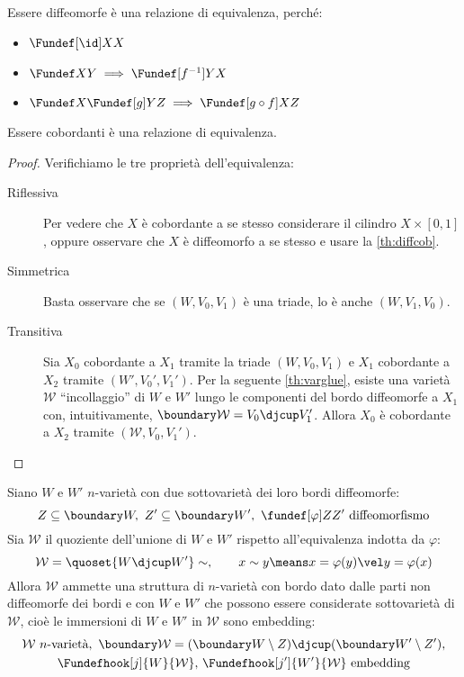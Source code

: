 \begin{oss}
	Essere diffeomorfe è una relazione di equivalenza, perché:
	\begin{itemize}
		\item $\Fundef[\id]XX$
		\item $\Fundef XY\implies\Fundef[f^{-1}]YX$
		\item $\Fundef X{\Fundef[g]YZ}\implies\Fundef[g\circ f]XZ$
	\end{itemize}
\end{oss}

\begin{lemma}
	Essere cobordanti è una relazione di equivalenza.
\end{lemma}

\begin{proof}
	Verifichiamo le tre proprietà dell'equivalenza:
	\begin{description}
		\item[Riflessiva]
			Per vedere che $X$ è cobordante a se stesso considerare il cilindro $X\times[0,1]$, oppure osservare che $X$ è diffeomorfo a se stesso e usare la \autoref{th:diffcob}.
		\item[Simmetrica]
			Basta osservare che se $(W,V_0,V_1)$ è una triade, lo è anche $(W,V_1,V_0)$.
		\item[Transitiva]
			Sia $X_0$ cobordante a $X_1$ tramite la triade $(W,V_0,V_1)$ e $X_1$ cobordante a $X_2$ tramite $(W',V_0',V_1')$.
			Per la seguente \autoref{th:varglue}, esiste una varietà $\mathcal W$ ``incollaggio'' di $W$ e $W'$ lungo le componenti del bordo diffeomorfe a $X_1$ con, intuitivamente, $\boundary\mathcal W=V_0\djcup V_1'$.
			Allora $X_0$ è cobordante a $X_2$ tramite $(\mathcal W,V_0,V_1')$.
			\qedhere
	\end{description}
\end{proof}

\begin{center}
	\vspace{-7mm} %
	
\end{center}

\begin{prop}[Incollaggio]
	\label{th:varglue}
	Siano $W$ e $W'$ $n$-varietà con due sottovarietà dei loro bordi diffeomorfe:
	\[Z\subseteq\boundary W,\ Z'\subseteq\boundary W',\ \fundef[\varphi]Z{Z'}\text{ diffeomorfismo}\]
	Sia $\mathcal W$ il quoziente dell'unione di $W$ e $W'$ rispetto all'equivalenza indotta da $\varphi$:
	\[\mathcal W=\quoset{W\djcup W'}\sim,\qquad x\sim y\means x=\varphi(y)\vel y=\varphi(x)\]
	Allora $\mathcal W$ ammette una struttura di $n$-varietà con bordo dato dalle parti non diffeomorfe dei bordi e con $W$ e $W'$ che possono essere considerate sottovarietà di $\mathcal W$, cioè le immersioni di $W$ e $W'$ in $\mathcal W$ sono embedding:
	\begin{gather*}
		\mathcal W\text{ $n$-varietà},\ \boundary\mathcal W=(\boundary W\setminus Z)\djcup(\boundary W'\setminus Z'),\\
		\Fundefhook[j]{W}{\mathcal W},\,\Fundefhook[j']{W'}{\mathcal W}\text{ embedding}
	\end{gather*}
\end{prop}

